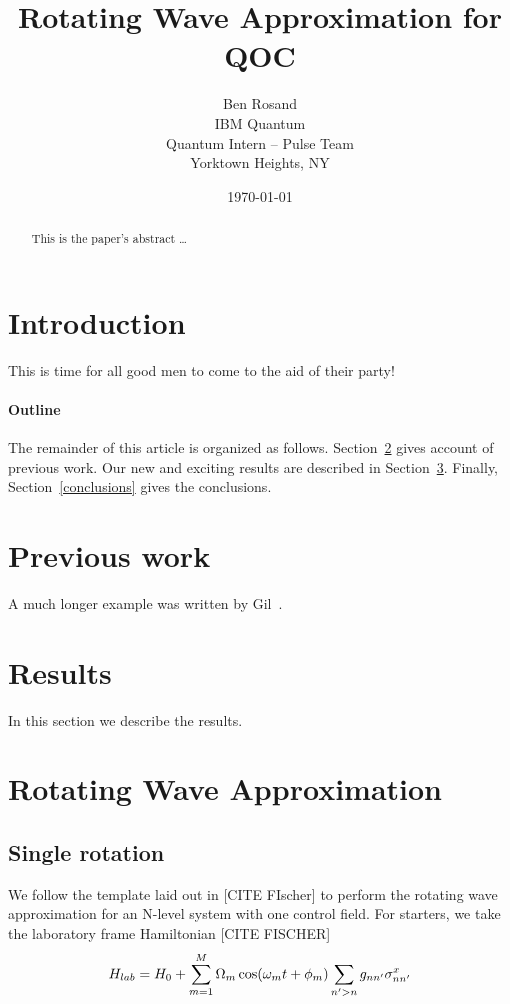 \documentclass[12pt]{article}
\title{Rotating Wave Approximation for QOC}
\author{
        Ben Rosand \\
        IBM Quantum \\
        Quantum Intern -- Pulse Team\\
        Yorktown Heights, NY
}
\date{\today}
\begin{document}
\maketitle

\begin{abstract}
This is the paper's abstract \ldots
\end{abstract}

\section{Introduction}
This is time for all good men to come to the aid of their party!

\paragraph{Outline}
The remainder of this article is organized as follows.
Section~\ref{previous work} gives account of previous work.
Our new and exciting results are described in Section~\ref{results}.
Finally, Section~\ref{conclusions} gives the conclusions.

\section{Previous work}\label{previous work}
A much longer \LaTeXe{} example was written by Gil~\cite{Gil:02}.

\section{Results}\label{results}
In this section we describe the results.

\section{Rotating Wave Approximation}\label{RWA}
\subsection{Single rotation}
We follow the template laid out in [CITE FIscher] to perform the rotating 
wave approximation for an N-level system with one control field. For starters, we take the laboratory frame Hamiltonian [CITE FISCHER]
\begin{equation}\large
        H_{lab} = H_0 + \sum^M_{m=1}\Omega_m \cos(\omega_m t + \phi_m) \sum_{n'>n} g_{nn'}\sigma^x_{nn'}
\end{equation}
\end{document}
